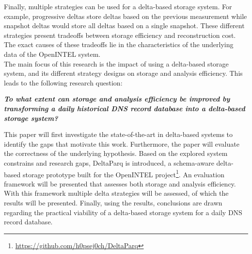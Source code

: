 Finally, multiple strategies can be used for a delta-based storage system. For example, 
progressive deltas store deltas based on the previous measurement while snapshot deltas 
would store all deltas based on a single snapshot. These different strategies present tradeoffs
between storage efficiency and reconstruction cost. The exact causes of these tradeoffs lie in 
the characteristics of the underlying data of the OpenINTEL system. \\ 

The main focus of this research is the impact of using a delta-based storage system, and its different 
strategy designs on storage and analysis efficiency. This leads to the following research question:

\begin{center}
    \textit{\textbf{
    To what extent can storage and analysis efficiency be improved by transforming a daily historical DNS 
record database into a delta-based storage system?}}
\end{center}

This paper will first investigate the state-of-the-art in delta-based systems 
to identify the gaps that motivate this work. Furthermore, the paper will evaluate the correctness of the underlying 
hypothesis. Based on the explored system constrains and research gaps, DeltaParq is introduced, a schema-aware delta-based 
storage prototype built for the OpenINTEL project\footnote{\url{https://github.com/h0psej0ch/DeltaParq}}. An evaluation framework 
will be presented that assesses both storage and analysis efficiency. With this framework multiple delta strategies will be assessed,
of which the results will be presented. Finally, using the results, conclusions are drawn regarding the practical viability of a 
delta-based storage system for a daily DNS record database.
